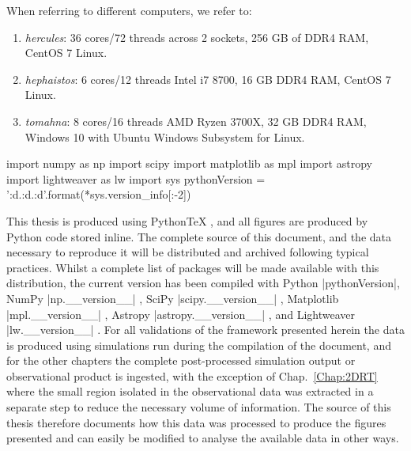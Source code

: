 When referring to different computers, we refer to:
\begin{enumerate}
    \item \emph{hercules}: 36 cores/72 threads  across 2 sockets, 256 GB of DDR4 RAM, CentOS 7 Linux.
    \item \emph{hephaistos}: 6 cores/12 threads Intel i7 8700, 16 GB DDR4 RAM, CentOS 7 Linux.
    \item \emph{tomahna}: 8 cores/16 threads AMD Ryzen 3700X, 32 GB DDR4 RAM, Windows 10 with Ubuntu Windows Subsystem for Linux.
\end{enumerate}

\begin{pycode}[Intro]
import numpy as np
import scipy
import matplotlib as mpl
import astropy
import lightweaver as lw
import sys
pythonVersion = '{:d}.{:d}.{:d}'.format(*sys.version_info[:-2])
\end{pycode}

This thesis is produced using PythonTeX \citep{Poore2015}, and all figures are produced by Python code stored inline.
The complete source of this document, and the data necessary to reproduce it will be distributed and archived following typical practices.
Whilst a complete list of packages will be made available with this distribution, the current version has been compiled with Python \py[Intro]|pythonVersion|, NumPy \py[Intro]|np.__version__| \citep{Harris2020}, SciPy \py[Intro]|scipy.__version__| \citep{Virtanen2020}, Matplotlib \py[Intro]|mpl.__version__| \citep{Hunter2007}, Astropy \py[Intro]|astropy.__version__| \citep{Robitaille2013,Price-Whelan2018}, and Lightweaver \py[Intro]|lw.__version__| \citep{Osborne2021}.
For all validations of the \Lw{} framework presented herein the data is produced using simulations run during the compilation of the document, and for the other chapters the complete post-processed simulation output or observational product is ingested, with the exception of Chap.~\ref{Chap:2DRT} where the small region isolated in the observational data was extracted in a separate step to reduce the necessary volume of information.
The source of this thesis therefore documents how this data was processed to produce the figures presented and can easily be modified to analyse the available data in other ways.

